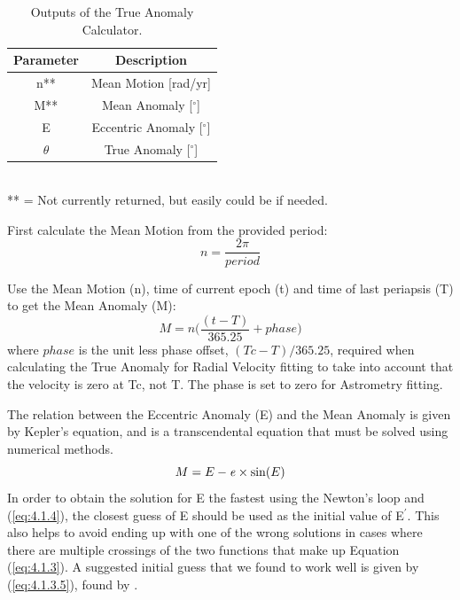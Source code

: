 \documentclass[12pt,preprint]{aastex}
\begin{document}

\begin{table}[h]
\centering
\caption{ Outputs of the True Anomaly Calculator.}
\begin{tabular}{c c}
\hline\hline
Parameter & Description \\
\hline
n** & Mean Motion [rad/yr] \\
M** & Mean Anomaly [$^{\circ}$]\\
E & Eccentric Anomaly [$^{\circ}$]\\
$\theta$ & True Anomaly [$^{\circ}$]\\
\hline
\end{tabular}
\\
 ** = Not currently returned, but easily could be if needed.
\end{table}
\pagebreak

First calculate the Mean Motion from the provided period:
\begin{equation}\label{eq:4.1.1}
n = \frac{2\pi}{period} 
\end{equation}

Use the Mean Motion (n), time of current epoch (t) and time of last periapsis (T) to get the Mean Anomaly (M):
\begin{equation}\label{eq:4.1.2}
M = n \bigg( \frac{(t-T)}{365.25} + phase\bigg)
\end{equation}
where $phase$ is the unit less phase offset, $(Tc-T)/365.25$, required when calculating the True Anomaly for Radial Velocity fitting to take into account that the velocity is zero at Tc, not T.  The phase is set to zero for Astrometry fitting.

The relation between the Eccentric Anomaly (E) and the Mean Anomaly is given by Kepler's equation, and is a transcendental equation that must be solved using numerical methods.
\begin{equation}\label{eq:4.1.3}
M = E - {\it e}\times\sin(E)
\end{equation}
In order to obtain the solution for E the fastest using the Newton's loop and (\ref{eq:4.1.4}), the closest guess of E should be used as the initial value of E$^{\prime}$.  This also helps to avoid ending up with one of the wrong solutions in cases where there are multiple crossings of the two functions that make up Equation (\ref{eq:4.1.3}).  A suggested initial guess that we found to work well is given by (\ref{eq:4.1.3.5}), found by \citep{Argyle}.
\end{document}
